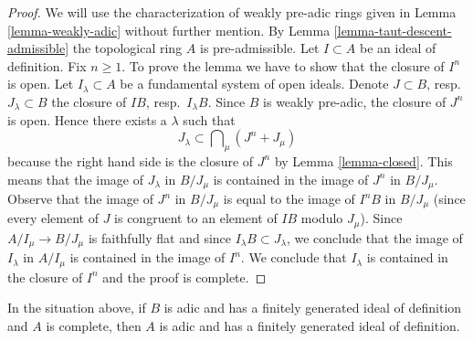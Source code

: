 \begin{proof}
We will use the characterization of weakly pre-adic rings given in
Lemma \ref{lemma-weakly-adic} without further mention.
By Lemma \ref{lemma-taut-descent-admissible}
the topological ring $A$ is pre-admissible.
Let $I \subset A$ be an ideal of definition.
Fix $n \geq 1$. To prove the lemma we have
to show that the closure of $I^n$ is open.
Let $I_\lambda \subset A$ be a fundamental system of open ideals.
Denote $J \subset B$, resp.\ $J_\lambda \subset B$
the closure of $IB$, resp.\ $I_\lambda B$.
Since $B$ is weakly pre-adic, the closure of $J^n$ is open.
Hence there exists a $\lambda$ such that
$$
J_\lambda \subset \bigcap\nolimits_\mu (J^n + J_\mu)
$$
because the right hand side is the closure of $J^n$ by
Lemma \ref{lemma-closed}.
This means that the image of $J_\lambda$ in $B/J_\mu$ is contained in the
image of $J^n$ in $B/J_\mu$. Observe that the image of $J^n$ in
$B/J_\mu$ is equal to the image of $I^nB$ in $B/J_\mu$ (since every element
of $J$ is congruent to an element of $IB$ modulo $J_\mu$).
Since $A/I_\mu \to B/J_\mu$ is faithfully flat and since
$I_\lambda B \subset J_\lambda$,
we conclude that the image of $I_\lambda$ in $A/I_\mu$
is contained in the image of $I^n$.
We conclude that $I_\lambda$ is contained in the closure
of $I^n$ and the proof is complete.
\end{proof}

\begin{lemma}
\label{lemma-taut-descent-adic}
In the situation above, if $B$ is adic and has a finitely generated
ideal of definition and $A$ is complete, then $A$ is adic and
has a finitely generated ideal of definition.
\end{lemma}

